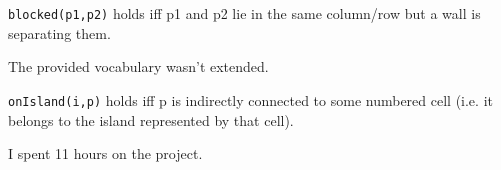 

\texttt{blocked(p1,p2)} holds iff p1 and p2 lie in the same column/row but a wall is separating them.


The provided vocabulary wasn't extended.


\texttt{onIsland(i,p)} holds iff p is indirectly connected to some numbered cell (i.e. it belongs to the island represented by that cell).


I spent 11 hours on the project.